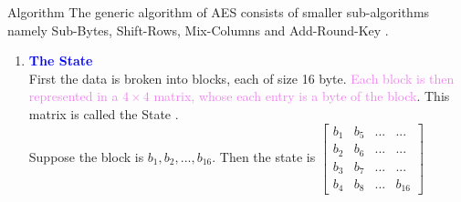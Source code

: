\documentclass{beamer}
\begin{document}
\begin{frame}[allowframebreaks]{Algorithm}
  The generic algorithm of AES consists of smaller sub-algorithms namely \textcolor{green!50!black}{Sub-Bytes, Shift-Rows, Mix-Columns and Add-Round-Key} \cite{aes}.
\vspace{2mm}
  \begin{enumerate}
  \item \textbf{\textcolor{blue}{The State}}\\
    First the data is broken into blocks, each of size 16 byte. \textcolor{violet}{Each block is then represented in a \(4 \times 4\) matrix, whose each entry is a byte of the block}. This matrix is called the State \cite{aes}.\\
    Suppose the block is \(b_1, b_2,...,b_{16}\). Then the state is
    \(\left[\begin{smallmatrix}
  b_1 & b_5 &... & ...\\
  b_2 & b_6 &... & ...\\
  b_3 & b_7 &... & ...\\
  b_4 & b_8 &... & b_{16}
\end{smallmatrix}\right]\)
\vspace{2mm}


\end{enumerate}
\end{frame}
\end{document}
